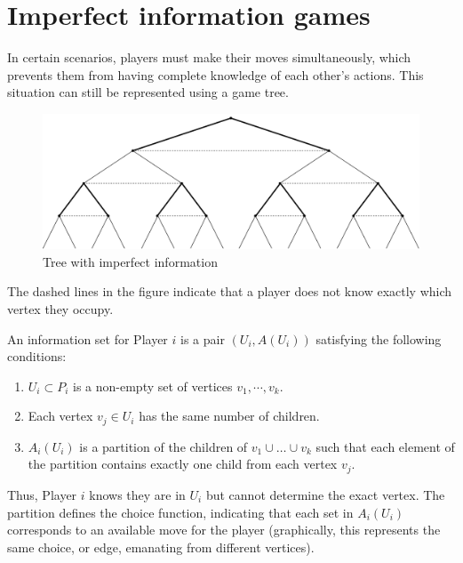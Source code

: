 \section{Imperfect information games}

In certain scenarios, players must make their moves simultaneously, which prevents them from having complete knowledge of each other's actions. 
This situation can still be represented using a game tree.
\begin{figure}[H]
    \centering
    \includegraphics[width=0.75\linewidth]{images/gt.png}
    \caption{Tree with imperfect information}
\end{figure}
The dashed lines in the figure indicate that a player does not know exactly which vertex they occupy.
\begin{definition}
    An information set for Player $i$ is a pair $(U_i, A(U_i))$ satisfying the following conditions: 
    \begin{enumerate}
        \item $U_i \subset P_i$ is a non-empty set of vertices $v_1, \cdots, v_k$.
        \item Each vertex $v_j\in U_i$ has the same number of children.
        \item $A_i(U_i)$ is a partition of the children of $v_1 \cup \dots \cup v_k$ such that each element of the partition contains exactly one child from each vertex $v_j$.
    \end{enumerate}
\end{definition}
\noindent Thus, Player $i$ knows they are in $U_i$ but cannot determine the exact vertex.
The partition defines the choice function, indicating that each set in $A_i(U_i)$ corresponds to an available move for the player (graphically, this represents the same choice, or edge, emanating from different vertices).
